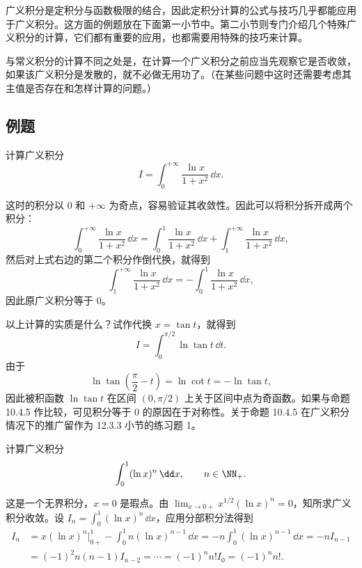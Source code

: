 广义积分是定积分与函数极限的结合，因此定积分计算的公式与技巧几乎都能应用于广义积分。这方面的例题放在下面第一小节中。第二小节则专门介绍几个特殊广义积分的计算，它们都有重要的应用，也都需要用特殊的技巧来计算。

与常义积分的计算不同之处是，在计算一个广义积分之前应当先观察它是否收敛，如果该广义积分是发散的，就不必做无用功了。（在某些问题中这时还需要考虑其主值是否存在和怎样计算的问题。）

\subsection{例题}

\begin{xexample}[12.3.1]
计算广义积分
\[
  I=\int_0^{+\infty}\frac{\ln x}{1+x^2}\,\dd x.
\]
\end{xexample}
\begin{xsolution}
这时的积分以 0 和 $+\infty$ 为奇点，容易验证其收敛性。因此可以将积分拆开成两个积分：
\[
  \int_0^{+\infty}\frac{\ln x}{1+x^2}\,\dd x
  =\int_0^1\frac{\ln x}{1+x^2}\,\dd x
  +\int_1^{+\infty}\frac{\ln x}{1+x^2}\,\dd x,
\]
然后对上式右边的第二个积分作倒代换，就得到
\[
  \int_1^{+\infty}\frac{\ln x}{1+x^2}\,\dd x
  =-\int_0^1\frac{\ln x}{1+x^2}\,\dd x,
\]
因此原广义积分等于 0。
\end{xsolution}

\begin{xremark}
以上计算的实质是什么？试作代换 $x=\tan t$，就得到
\[
  I=\int_0^{\pi/2}\ln\tan t\,\dd t.
\]
由于
\[
  \ln\tan\left(\frac\pi2-t\right)=\ln\cot t=-\ln\tan t,
\]
因此被积函数 $\ln\tan t$ 在区间 $(0,\pi/2)$ 上关于区间中点为奇函数。如果与命题 10.4.5 作比较，可见积分等于 0 的原因在于对称性。关于命题 10.4.5 在广义积分情况下的推广留作为 12.3.3 小节的练习题 1。
\end{xremark}

\begin{xexample}[12.3.2]
计算广义积分
\[
  \int_0^1(\ln x)^n\,\dd x,\qquad n\in\NN_+.
\]
\end{xexample}
\begin{xsolution}
这是一个无界积分，$x=0$ 是瑕点。由 $\lim_{x\to0+}x^{1/2}(\ln x)^n=0$，知所求广义积分收敛。设 $I_n=\int_0^1(\ln x)^n\,\dd x$，应用分部积分法得到
\begin{align*}
  I_n
  &=x(\ln x)^n\big|_{0+}^1-\int_0^1n(\ln x)^{n-1}\,\dd x
  =-n\int_0^1(\ln x)^{n-1}\,\dd x=-nI_{n-1}\\
  &=(-1)^2n(n-1)I_{n-2}=\cdots=(-1)^nn!I_0=(-1)^nn!.
\end{align*}
\end{xsolution}


